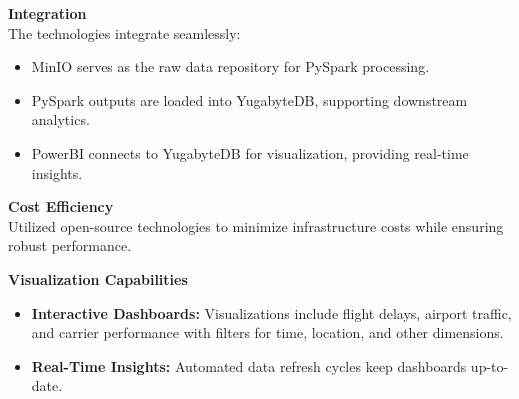 \documentclass[12pt,a4paper]{article}
\begin{document}
\textbf{Integration}\\
The technologies integrate seamlessly:
\begin{itemize}
    \item MinIO serves as the raw data repository for PySpark processing.
    \item PySpark outputs are loaded into YugabyteDB, supporting downstream analytics.
    \item PowerBI connects to YugabyteDB for visualization, providing real-time insights.
\end{itemize}

\textbf{Cost Efficiency}\\
Utilized open-source technologies to minimize infrastructure costs while ensuring robust performance.

\textbf{Visualization Capabilities}
\begin{itemize}
    \item \textbf{Interactive Dashboards:} Visualizations include flight delays, airport traffic, and carrier performance with filters for time, location, and other dimensions.
    \item \textbf{Real-Time Insights:} Automated data refresh cycles keep dashboards up-to-date.
\end{itemize}

\nocite{*}



\end{document}
